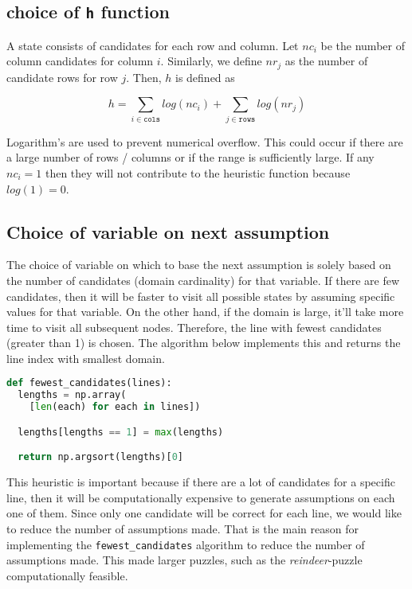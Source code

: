 \subsection*{choice of \texttt{h} function}
A state consists of candidates for each row and column. Let $nc_i$ be the
number of column candidates for column $i$. Similarly, we define $nr_j$ as the
number of candidate rows for row $j$. Then, $h$ is defined as

\begin{displaymath}
  h = \sum\limits_{i \in \texttt{cols}} log(nc_i) + \sum\limits_{j \in \texttt{rows}} log(nr_j)
\end{displaymath}

Logarithm's are used to prevent numerical overflow. This could occur if there
are a large number of rows / columns or if the range is sufficiently large. If any
$nc_i = 1$ then they will not contribute to the heuristic function because $log(1) = 0$.

\subsection*{Choice of variable on next assumption}
The choice of variable on which to base the next assumption is solely based
on the number of candidates (domain cardinality) for that variable. If there
are few candidates, then it will be faster to visit all possible states by
assuming specific values for that variable. On the other hand, if the domain
is large, it'll take more time to visit all subsequent nodes. Therefore, the
line with fewest candidates (greater than 1) is chosen. The algorithm below
implements this and returns the line index with smallest domain.

\begin{algorithm}
\begin{footnotesize}
\begin{lstlisting}[language=Python, caption=Algorithm used to find the row / column with smallest domain.]
def fewest_candidates(lines):
  lengths = np.array(
    [len(each) for each in lines])

  lengths[lengths == 1] = max(lengths)

  return np.argsort(lengths)[0]
\end{lstlisting}
\end{footnotesize}
\end{algorithm}

This heuristic is important because if there are a lot of candidates for a specific line,
then it will be computationally expensive to generate assumptions on each one of them.
Since only one candidate will be correct for each line, we would like to reduce the number
of assumptions made. That is the main reason for implementing the \texttt{fewest\_candidates}
algorithm to reduce the number of assumptions made. This made larger puzzles, such as
the \textit{reindeer}-puzzle computationally feasible.
